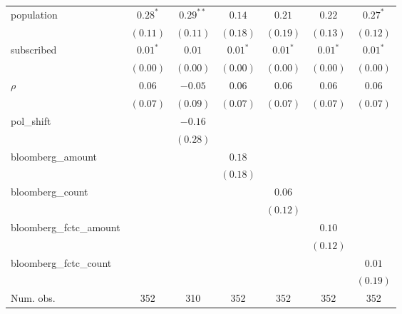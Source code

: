 \begin{table}[!h]
\begin{center}
\begin{tabular}{l c c c c c c }
population              & $0.28^{*}$   & $0.29^{**}$  & $0.14$       & $0.21$       & $0.22$       & $0.27^{*}$   \\
                        & $(0.11)$     & $(0.11)$     & $(0.18)$     & $(0.19)$     & $(0.13)$     & $(0.12)$     \\
subscribed              & $0.01^{*}$   & $0.01$       & $0.01^{*}$   & $0.01^{*}$   & $0.01^{*}$   & $0.01^{*}$   \\
                        & $(0.00)$     & $(0.00)$     & $(0.00)$     & $(0.00)$     & $(0.00)$     & $(0.00)$     \\
$\rho$                  & $0.06$       & $-0.05$      & $0.06$       & $0.06$       & $0.06$       & $0.06$       \\
                        & $(0.07)$     & $(0.09)$     & $(0.07)$     & $(0.07)$     & $(0.07)$     & $(0.07)$     \\
pol\_shift              &              & $-0.16$      &              &              &              &              \\
                        &              & $(0.28)$     &              &              &              &              \\
bloomberg\_amount       &              &              & $0.18$       &              &              &              \\
                        &              &              & $(0.18)$     &              &              &              \\
bloomberg\_count        &              &              &              & $0.06$       &              &              \\
                        &              &              &              & $(0.12)$     &              &              \\
bloomberg\_fctc\_amount &              &              &              &              & $0.10$       &              \\
                        &              &              &              &              & $(0.12)$     &              \\
bloomberg\_fctc\_count  &              &              &              &              &              & $0.01$       \\
                        &              &              &              &              &              & $(0.19)$     \\
\midrule
Num. obs.               & 352          & 310          & 352          & 352          & 352          & 352          \\

\end{tabular}
\end{center}
\end{table}
